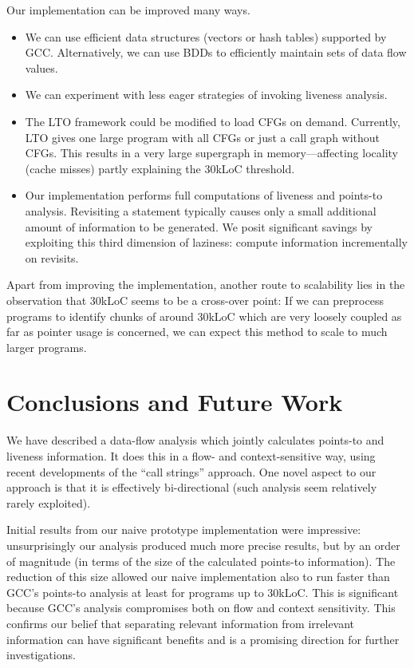 \documentclass{llncs}
\begin{document}
Our implementation can be improved many ways.
\begin{itemize}
\item We can use efficient data structures (vectors or hash tables)
      supported by GCC\@. Alternatively, we can use
      BDDs to efficiently maintain sets of data flow values.
\item We can experiment with less eager strategies of invoking liveness analysis.
\item The LTO framework could be modified to load CFGs on demand.
      Currently,
      LTO gives one large program with all CFGs or just a call
      graph without CFGs.
      This results in a very large supergraph in memory---affecting
      locality (cache misses) partly explaining the 30kLoC threshold.
\item Our implementation performs full computations of liveness
      and points-to analysis.
      Revisiting a statement typically causes only
      a small additional amount of information to be generated.
      We posit significant savings by exploiting this third
      dimension of laziness: compute information incrementally on revisits.
\end{itemize}

\noindent
Apart from improving the implementation, another route to scalability 
lies in the observation that 30kLoC seems to be a cross-over point: 
If we can preprocess programs to identify chunks of around 30kLoC which
are very loosely coupled as far as pointer usage is concerned,
we can expect this method to scale to much larger programs.

\section{Conclusions and Future Work}
\label{sec:conclusions}

We have described a data-flow analysis which jointly calculates
points-to and liveness information.
It does this in a flow- and context-sensitive way, using recent developments
of the ``call strings'' approach.
One novel aspect to our approach is that it is effectively bi-directional
(such analysis seem relatively rarely exploited).

Initial results from our naive prototype implementation were impressive:
unsurprisingly our analysis produced much more precise results, but
by an order of magnitude (in terms of the size of the calculated
points-to information).  The reduction of this size allowed our
naive implementation also to run faster than GCC's points-to
analysis at least for programs up to 30kLoC. This is significant because
GCC's analysis compromises both on flow and context sensitivity.
This confirms our belief that separating relevant information from
irrelevant information can have significant benefits and is a promising
direction for further investigations.
\end{document}
